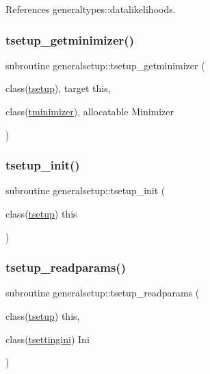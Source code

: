 References generaltypes\+::datalikelihoods.

\mbox{\label{namespacegeneralsetup_ab96236dacfcf61193bfa8604d0f82fc0}} 
\subsubsection{\texorpdfstring{tsetup\+\_\+getminimizer()}{tsetup\_getminimizer()}}
{\footnotesize\ttfamily subroutine generalsetup\+::tsetup\+\_\+getminimizer (\begin{DoxyParamCaption}\item[{class(\mbox{\hyperlink{structgeneralsetup_1_1tsetup}{tsetup}}), target}]{this,  }\item[{class(\mbox{\hyperlink{structminimize_1_1tminimizer}{tminimizer}}), allocatable}]{Minimizer }\end{DoxyParamCaption})}

\mbox{\label{namespacegeneralsetup_af2242426644f3fa7db9c7ca3726aeaca}} 
\subsubsection{\texorpdfstring{tsetup\+\_\+init()}{tsetup\_init()}}
{\footnotesize\ttfamily subroutine generalsetup\+::tsetup\+\_\+init (\begin{DoxyParamCaption}\item[{class(\mbox{\hyperlink{structgeneralsetup_1_1tsetup}{tsetup}})}]{this }\end{DoxyParamCaption})}

\mbox{\label{namespacegeneralsetup_a2153d54792461f99885b6bdc078cbfe8}} 
\subsubsection{\texorpdfstring{tsetup\+\_\+readparams()}{tsetup\_readparams()}}
{\footnotesize\ttfamily subroutine generalsetup\+::tsetup\+\_\+readparams (\begin{DoxyParamCaption}\item[{class(\mbox{\hyperlink{structgeneralsetup_1_1tsetup}{tsetup}})}]{this,  }\item[{class(\mbox{\hyperlink{structsettings_1_1tsettingini}{tsettingini}})}]{Ini }\end{DoxyParamCaption})}



